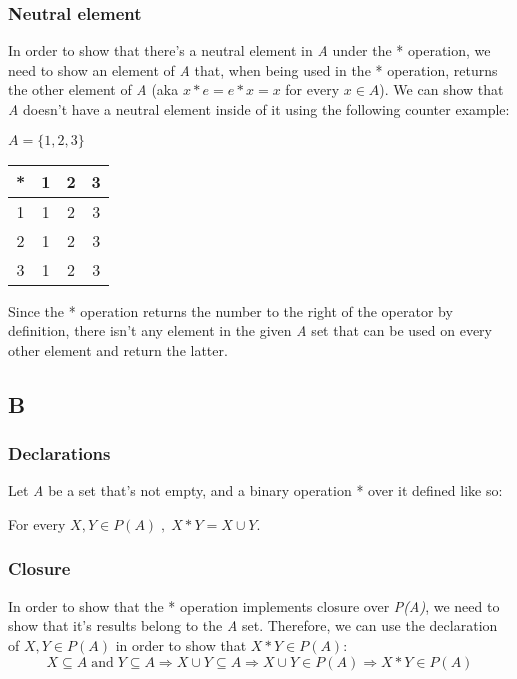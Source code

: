 \documentclass[12pt, oneside]{article}
\begin{document}
\subsubsection{Neutral element}
In order to show that there's a neutral element in \emph{A} under the * operation, we need to show an element of \emph{A} that, when being used in the * operation, returns the other element of \emph{A} (aka $x * e = e * x = x$ for every $x \in A$). We can show that \emph{A} doesn't have a neutral element inside of it using the following counter example:
\begin{center}
$A = \{1, 2, 3\}$\\
\hfill\break
\begin{tabular}{c|c|c|c}
* & 1 & 2 & 3\\
\hline
1 & 1 & 2 & 3\\
\hline
2 & 1 & 2 & 3\\
\hline
3 & 1 & 2 & 3
\end{tabular}
\end{center}
Since the * operation returns the number to the right of the operator by definition, there isn't any element in the given \emph{A} set that can be used on every other element and return the latter.
\clearpage

\subsection{B}
\setcounter{subsubsection}{-1}
\subsubsection{Declarations}
Let \emph{A} be a set that's not empty, and a binary operation * over it defined like so:
\begin{center}
For every $X, Y \in P(A)\;,\;X * Y = X \cup Y$.
\end{center}

\subsubsection{Closure}
In order to show that the * operation implements closure over \emph{P(A)}, we need to show that it's results belong to the \emph{A} set. Therefore, we can use the declaration of $X, Y \in P(A)$ in order to show that $X * Y \in P(A)$:
\begin{equation*}
X \subseteq A\;\text{and}\;Y \subseteq A \Rightarrow
X \cup Y \subseteq A \Rightarrow
X \cup Y \in P(A) \Rightarrow
X * Y \in P(A)
\end{equation*}
\end{document}

